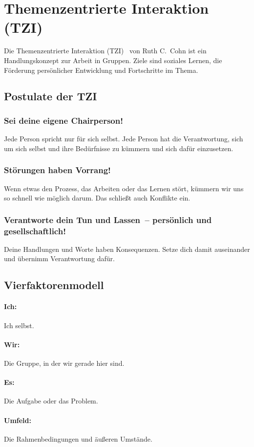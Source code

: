 \section{Themenzentrierte Interaktion (TZI)}
\label{tzi}

Die Themenzentrierte Interaktion (TZI)~\cite{tzi-cohn, tzi-reiser} von Ruth C.~Cohn ist ein Handlungskonzept zur Arbeit in Gruppen. Ziele sind soziales Lernen, die Förderung persönlicher Entwicklung und Fortschritte im Thema.


\subsection{Postulate der TZI}

\subsubsection{Sei deine eigene Chairperson!}

Jede Person spricht nur für sich selbst. Jede Person hat die Verantwortung, sich um sich selbst und ihre Bedürfnisse zu kümmern und sich dafür einzusetzen.

\subsubsection{Störungen haben Vorrang!}

Wenn etwas den Prozess, das Arbeiten oder das Lernen stört, kümmern wir uns so schnell wie möglich darum. Das schließt auch Konflikte ein.

\subsubsection{Verantworte dein Tun und Lassen~-- persönlich und gesellschaftlich!}

Deine Handlungen und Worte haben Konsequenzen. Setze dich damit auseinander und übernimm Verantwortung dafür.


\subsection{Vierfaktorenmodell}

\paragraph{Ich:} Ich selbst.

\paragraph{Wir:} Die Gruppe, in der wir gerade hier sind.

\paragraph{Es:} Die Aufgabe oder das Problem.

\paragraph{Umfeld:} Die Rahmenbedingungen und äußeren Umstände.
